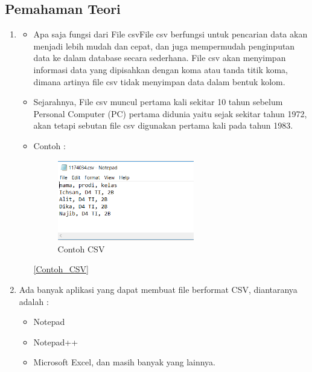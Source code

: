	\subsection{Pemahaman Teori}
		\begin{enumerate}
			\item \begin{itemize}
					\item Apa saja fungsi dari File csvFile csv berfungsi untuk pencarian data akan menjadi lebih mudah dan cepat, dan juga mempermudah penginputan data ke dalam database secara sederhana. File csv akan menyimpan informasi data yang dipisahkan dengan koma atau tanda titik koma, dimana artinya file csv tidak menyimpan data dalam bentuk kolom.
					\item Sejarahnya, File csv muncul pertama kali sekitar 10 tahun sebelum Personal Computer (PC) pertama  didunia yaitu sejak sekitar tahun 1972, akan tetapi sebutan file csv digunakan pertama kali pada tahun 1983.
					\item Contoh : 
						\begin{figure} [ht]
							\centerline{\includegraphics[width=0.6\textwidth]{figures/4/1174034/1174034.PNG}}
							\caption{Contoh CSV}
							\label{Contoh CSV}
						\end{figure}

					\ref{Contoh_CSV}
				\end{itemize}
			
			\item Ada banyak aplikasi yang dapat membuat file berformat CSV, diantaranya adalah :
				\begin{itemize}
					\item Notepad
					\item Notepad++
					\item Microsoft Excel, dan masih banyak yang lainnya.
				\end{itemize}
			

\end{enumerate}

